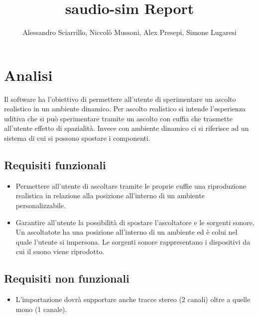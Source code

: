 \documentclass[a4paper,12pt]{report}
\title{saudio-sim Report}
\author{Alessandro Sciarrillo, Niccolò Mussoni, Alex Presepi, Simone Lugaresi}
\begin{document}
\maketitle

\tableofcontents
\chapter{Analisi}
Il software ha l'obiettivo di permettere all'utente di sperimentare un ascolto realistico in un ambiente dinamico.
%
Per ascolto realistico si intende l'esperienza uditiva che si può sperimentare tramite un ascolto con cuffia che trasmette all'utente effetto di spazialità.
%
Invece con ambiente dinamico ci si riferisce ad un sistema di cui si possono spostare i componenti.

\section{Requisiti funzionali}
\begin{itemize}
	\item  Permettere all'utente di ascoltare tramite le proprie cuffie una riproduzione realistica in relazione alla posizione all'interno di un ambiente personalizzabile.
	\item Garantire all'utente la possibilità di spostare l'ascoltatore e le sorgenti sonore.
		Un ascoltatote ha una posizione all'interno di un ambiente ed è colui nel quale l'utente si impersona.
		Le sorgenti sonore rappresentano i dispositivi da cui il suono viene riprodotto. 
\end{itemize}

\section{Requisiti non funzionali}
\begin{itemize}
	\item L'importazione dovrà supportare anche tracce stereo (2 canali) oltre a quelle mono (1 canale).
\end{itemize}
\end{document}
